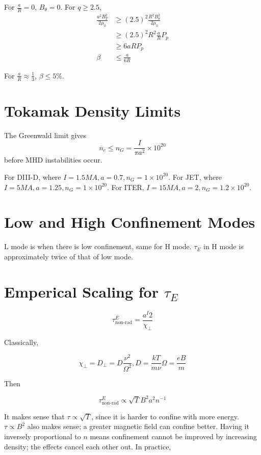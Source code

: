 \documentclass[12pt]{article}
\begin{document}
For $\frac{a}{R} = 0$, $B_\theta = 0$. For $q \geq 2.5$,
\begin{align*}
    \frac{a^2B_T^2}{2\mu_0} &\geq (2.5)^2\frac{R^2B_\theta^2}{2\mu_0} \\
                            &\geq (2.5)^2R^2 \frac{a}{R} P_p \\
                            &\geq 6aRP_p \\
    \beta &\leq \frac{a}{6R}
\end{align*}

For $\frac{a}{R} \approx \frac{1}{3}$, $\beta \leq 5\%$.

\section{Tokamak Density Limits}

The Greenwald limit gives
$$\overline n_e \leq n_G = \frac{I}{\pi a^2} \times 10^{20}$$
before MHD instabilities occur.

\begin{ex}
    For DIII-D, where $I = 1.5 \unit{MA}, a = 0.7, n_G = 1 \times 10^{20}$. For JET, where $I = 5\unit{MA}, a = 1.25, n_G = 1 \times 10^{20}$. For ITER, $I = 15\unit{MA}, a = 2, n_G = 1.2 \times 10^{20}$.
\end{ex}

\section{Low and High Confinement Modes}

L mode is when there is low confinement, same for H mode. $\tau_E$ in H mode is approximately twice of that of low mode.

\section{Emperical Scaling for $\tau_E$}

$$\tau^E_{\text{non-rad}} = \frac{a^I2}{\chi_\perp}$$

Classically,

$$\chi_\perp = D_\perp = D\frac{\nu^2}{\Omega^2}, D = \frac{kT}{m\nu} \Omega = \frac{eB}{m}$$

Then

$$\tau^E_{\text{non-rad}} \propto \sqrt T B^2 a^2 n^{-1}$$

It makes sense that $\tau \propto \sqrt T$, since it is harder to confine with more energy. $\tau \propto B^2$ also makes sense; a greater magnetic field can confine better. Having it inversely proportional to $n$ means confinement cannot be improved by increasing density; the effects cancel each other out. In practice,
\end{document}
